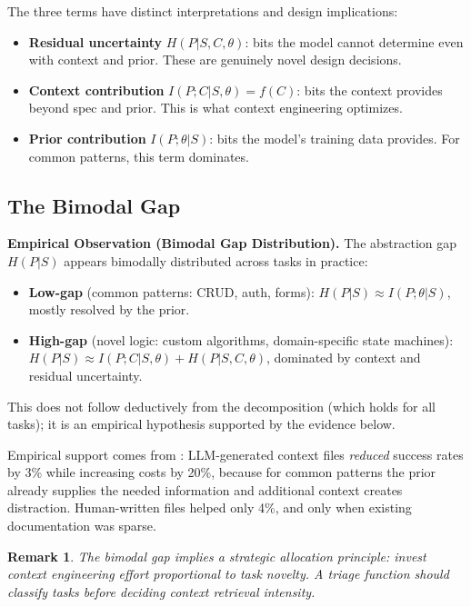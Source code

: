\documentclass[11pt, a4paper, copyright]{googledeepmind}
\newtheorem*{remark}{Remark}
\begin{document}
The three terms have distinct interpretations and design implications:

\begin{itemize}[nosep]
    \item \textbf{Residual uncertainty} $H(P|S,C,\theta)$: bits the model cannot determine even with context and prior. These are genuinely novel design decisions.
    \item \textbf{Context contribution} $I(P;C|S,\theta) = f(C)$: bits the context provides beyond spec and prior. This is what context engineering optimizes.
    \item \textbf{Prior contribution} $I(P;\theta|S)$: bits the model's training data provides. For common patterns, this term dominates.
\end{itemize}

\subsection{The Bimodal Gap}
\label{sec:bimodal}

\noindent\textbf{Empirical Observation (Bimodal Gap Distribution).}
\label{cor:bimodal}
The abstraction gap $H(P|S)$ appears bimodally distributed across tasks in practice:
\begin{itemize}[nosep]
    \item \textbf{Low-gap} (common patterns: CRUD, auth, forms): $H(P|S) \approx I(P;\theta|S)$, mostly resolved by the prior.
    \item \textbf{High-gap} (novel logic: custom algorithms, domain-specific state machines): $H(P|S) \approx I(P;C|S,\theta) + H(P|S,C,\theta)$, dominated by context and residual uncertainty.
\end{itemize}
This does not follow deductively from the decomposition (which holds for all tasks); it is an empirical hypothesis supported by the evidence below.

Empirical support comes from \citet{gloaguen2026agents}: LLM-generated context files \emph{reduced} success rates by 3\% while increasing costs by 20\%, because for common patterns the prior already supplies the needed information and additional context creates distraction. Human-written files helped only 4\%, and only when existing documentation was sparse.

\begin{remark}
The bimodal gap implies a strategic allocation principle: invest context engineering effort proportional to task novelty. A triage function should classify tasks before deciding context retrieval intensity.
\end{remark}
\end{document}

